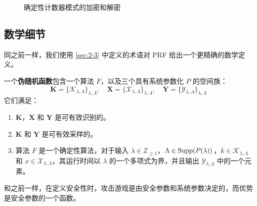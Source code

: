 \begin{figure}
  \centering

  \caption{确定性计数器模式的加密和解密}
  \label{fig:4-13}
\end{figure}

\subsection{数学细节}

同之前一样，我们使用 \ref{sec:2-3} 中定义的术语对 PRF 给出一个更精确的数学定义。

\begin{definition}[伪随机函数]
一个\textbf{伪随机函数}包含一个算法 $F$，以及三个具有系统参数化 $P$ 的空间族：
\[
\mathbf{K}=\{\mathcal{K}_{\lambda,\Lambda}\}_{\lambda,\Lambda},\quad
\mathbf{X}=\{\mathcal{X}_{\lambda,\Lambda}\}_{\lambda,\Lambda},\quad
\mathbf{Y}=\{\mathcal{Y}_{\lambda,\Lambda}\}_{\lambda,\Lambda}
\]
它们满足：
\begin{enumerate}
	\item $\mathbf{K}$，$\mathbf{X}$ 和 $\mathbf{Y}$ 是可有效识别的。
	\item $\mathbf{K}$ 和 $\mathbf{Y}$ 是可有效采样的。
	\item 算法 $F$ 是一个确定性算法，对于输入 $\lambda\in\mathbb{Z}_{\geq1}$，$\Lambda\in{\rm Supp}(P(\lambda))$，$k\in\mathcal{K}_{\lambda,\Lambda}$ 和 $x\in\mathcal{X}_{\lambda,\Lambda}$，其运行时间以 $\lambda$ 的一个多项式为界，并且输出 $\mathcal{Y}_{\lambda,\Lambda}$ 中的一个元素。
\end{enumerate}
\end{definition}
和之前一样，在定义安全性时，攻击游戏是由安全参数和系统参数决定的，而优势是安全参数的一个函数。